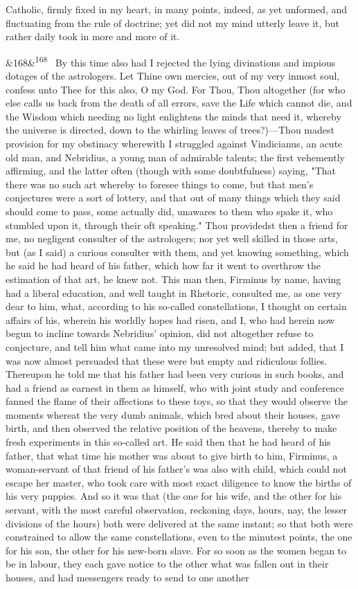 \documentclass[12pt]{article}
\newcommand{\para}[1][]{\par\noindent\ifx&#1&\else\textsuperscript{\footnotesize #1}~\fi}
\begin{document}
Catholic, firmly fixed in my heart, in many points, indeed, as yet unformed, and fluctuating from the rule of doctrine; yet did not my mind utterly leave it, but rather daily took in more and more of it.

\para[168] By this time also had I rejected the lying divinations and impious dotages of the astrologers. Let Thine own mercies, out of my very inmost soul, confess unto Thee for this also, O my God. For Thou, Thou altogether (for who else calls us back from the death of all errors, save the Life which cannot die, and the Wisdom which needing no light enlightens the minds that need it, whereby the universe is directed, down to the whirling leaves of trees?)---Thou madest provision for my obstinacy wherewith I struggled against Vindicianus, an acute old man, and Nebridius, a young man of admirable talents; the first vehemently affirming, and the latter often (though with some doubtfulness) saying, "That there was no such art whereby to foresee things to come, but that men's conjectures were a sort of lottery, and that out of many things which they said should come to pass, some actually did, unawares to them who spake it, who stumbled upon it, through their oft speaking." Thou providedst then a friend for me, no negligent consulter of the astrologers; nor yet well skilled in those arts, but (as I said) a curious consulter with them, and yet knowing something, which he said he had heard of his father, which how far it went to overthrow the estimation of that art, he knew not. This man then, Firminus by name, having had a liberal education, and well taught in Rhetoric, consulted me, as one very dear to him, what, according to his so-called constellations, I thought on certain affairs of his, wherein his worldly hopes had risen, and I, who had herein now begun to incline towards Nebridius' opinion, did not altogether refuse to conjecture, and tell him what came into my unresolved mind; but added, that I was now almost persuaded that these were but empty and ridiculous follies. Thereupon he told me that his father had been very curious in such books, and had a friend as earnest in them as himself, who with joint study and conference fanned the flame of their affections to these toys, so that they would observe the moments whereat the very dumb animals, which bred about their houses, gave birth, and then observed the relative position of the heavens, thereby to make fresh experiments in this so-called art. He said then that he had heard of his father, that what time his mother was about to give birth to him, Firminus, a woman-servant of that friend of his father's was also with child, which could not escape her master, who took care with most exact diligence to know the births of his very puppies. And so it was that (the one for his wife, and the other for his servant, with the most careful observation, reckoning days, hours, nay, the lesser divisions of the hours) both were delivered at the same instant; so that both were constrained to allow the same constellations, even to the minutest points, the one for his son, the other for his new-born slave. For so soon as the women began to be in labour, they each gave notice to the other what was fallen out in their houses, and had messengers ready to send to one another 
\end{document}
